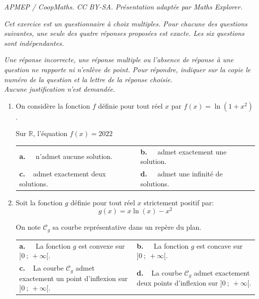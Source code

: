 \documentclass[10pt]{article}
\providecommand{\R}{\mathbb{R}}
\providecommand{\np}[2][]{{#2~#1}}
\begin{document}
\noindent\textit{APMEP / CoopMaths. CC BY-SA. Présentation adaptée par Maths Explorer.}\par\medskip
\medskip

\emph{Cet exercice est un questionnaire à choix multiples. Pour chacune des questions suivantes, une seule des quatre réponses proposées est exacte. Les six questions sont indépendantes.}

\smallskip

\emph{Une réponse incorrecte, une réponse multiple ou l'absence de réponse à une question ne rapporte ni n'enlève de point. Pour répondre, indiquer sur la copie le numéro de la question et la lettre de la réponse choisie. \\
Aucune justification n'est demandée.}

\medskip

\begin{enumerate}
\item On considère la fonction $f$ définie pour tout réel $x$ par $f(x) = \ln \left(1  + x^2\right)$. 

Sur $\R$, l'équation $f(x) = \np{2022}$

\begin{center}
\begin{tabularx}{\linewidth}{*{2}{X}}
\textbf{a.~~} n'admet aucune solution. &\textbf{b.~~} admet exactement une solution.\\
\textbf{c.~~}admet exactement deux solutions.&\textbf{d.~~} admet une infinité de solutions.
\end{tabularx}
\end{center}

\item Soit la fonction $g$ définie pour tout réel $x$ strictement positif par: 
\[g(x) = x \ln (x) - x^2\]

On note $\mathcal{C}_g$ sa courbe représentative dans un repère du plan.

\begin{center}
\begin{tabularx}{\linewidth}{*{2}{X}}
\textbf{a.~~} La fonction $g$ est convexe sur $]0~;~+\infty[$.&\textbf{b.~~} La fonction $g$ est concave sur $]0~;~+\infty[$.\\
\textbf{c.~~}La courbe $\mathcal{C}_g$ admet exactement un point d'inflexion sur $]0~;~+\infty[$.&\textbf{d.~~}La courbe $\mathcal{C}_g$ admet exactement
deux points d'inflexion sur $]0~;~+\infty[$.
\end{tabularx}
\end{center}


\end{enumerate}
\end{document}
